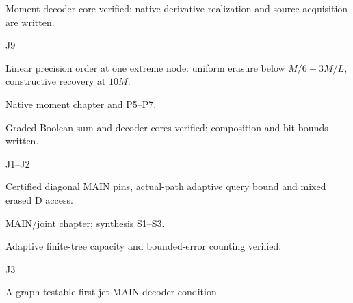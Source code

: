 \documentclass[11pt,a4paper]{article}
\newlength{\OfflineResearchTableWidth}
\newcommand{\OfflineResearchRow}{\par}
\newenvironment{OfflineResearchTable}{%
  \par\medskip\begingroup\small\setlength{\parindent}{0pt}%
  \setlength{\parskip}{3pt plus 1pt minus .5pt}%
  \setlength{\OfflineResearchTableWidth}{\linewidth}%
}{%
  \par\endgroup\medskip%
}
\begin{document}
\begin{OfflineResearchTable}
\begin{minipage}[t]{0.31185\OfflineResearchTableWidth}\raggedright
Moment decoder core
verified; native derivative realization and source acquisition are
written.
\end{minipage}%
\OfflineResearchRow
\noindent%
\begin{minipage}[t]{0.06615\OfflineResearchTableWidth}\raggedright
J9
\end{minipage}\hfill%
\begin{minipage}[t]{0.27405\OfflineResearchTableWidth}\raggedright
Linear precision order at one extreme node: uniform erasure below
\(M/6-3M/L\), constructive recovery at \(10M\).
\end{minipage}\hfill%
\begin{minipage}[t]{0.29295\OfflineResearchTableWidth}\raggedright
Native moment chapter
and P5--P7.
\end{minipage}\hfill%
\begin{minipage}[t]{0.31185\OfflineResearchTableWidth}\raggedright
Graded Boolean sum and decoder cores verified; composition
and bit bounds written.
\end{minipage}%
\OfflineResearchRow
\noindent%
\begin{minipage}[t]{0.06615\OfflineResearchTableWidth}\raggedright
J1--J2
\end{minipage}\hfill%
\begin{minipage}[t]{0.27405\OfflineResearchTableWidth}\raggedright
Certified diagonal MAIN pins, actual-path adaptive query bound
and mixed erased D access.
\end{minipage}\hfill%
\begin{minipage}[t]{0.29295\OfflineResearchTableWidth}\raggedright
MAIN/joint chapter; synthesis S1--S3.
\end{minipage}\hfill%
\begin{minipage}[t]{0.31185\OfflineResearchTableWidth}\raggedright
Adaptive finite-tree capacity and bounded-error counting verified.
\end{minipage}%
\OfflineResearchRow
\noindent%
\begin{minipage}[t]{0.06615\OfflineResearchTableWidth}\raggedright
J3
\end{minipage}\hfill%
\begin{minipage}[t]{0.27405\OfflineResearchTableWidth}\raggedright
A graph-testable first-jet MAIN decoder condition.
\end{minipage}\hfill%
\begin{minipage}[t]{0.29295\OfflineResearchTableWidth}\raggedright

\end{minipage}
\end{OfflineResearchTable}
\end{document}
